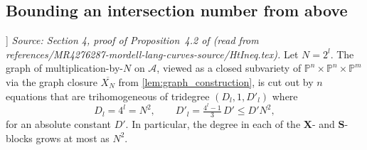 \subsection{Bounding an intersection number from above}

\begin{lemma}[Bihomogeneous degree bound for \([N]\)]
  \label{lem:bihomog_degree}
  \textit{Source: Section 4, proof of Proposition~4.2 of \cite{MR4276287-mordell-lang-curves} (read from references/MR4276287-mordell-lang-curves-source/HtIneq.tex).}
  Let \(N = 2^l\). The graph of multiplication-by-\(N\) on \(\mathcal{A}\),
  viewed as a closed subvariety of
  \(\mathbb{P}^n \times \mathbb{P}^n \times \mathbb{P}^m\) via the graph
  closure \(\overline{X_N}\) from \cref{lem:graph_construction}, is cut out
  by \(n\) equations that are trihomogeneous of tridegree \((D_l, 1, D'_l)\)
  where
  \[
    D_l = 4^l = N^2, \qquad D'_l = \tfrac{4^l - 1}{3}\,D' \le D' N^2,
  \]
  for an absolute constant \(D'\). In particular, the degree in each of the
  \(\mathbf{X}\)- and \(\mathbf{S}\)-blocks grows at most as \(N^2\).
\end{lemma}

